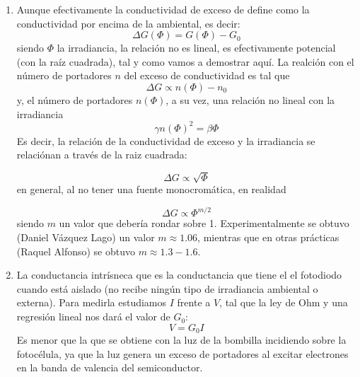 \begin{enumerate}[label=\alph*)]
	\item Aunque efectivamente la conductividad de exceso de define como la conductividad por encima de la ambiental, es decir:
	      \begin{equation*}
		      \Delta G (\Phi) = G(\Phi)  - G_0
	      \end{equation*}
	siendo $\Phi$ la irradiancia, la relación no es lineal, es efectivamente potencial (con la raíz cuadrada), tal y como vamos a demostrar aquí. La realción con el número de portadores $n$ del exceso de conductividad es tal que
	      \begin{equation*}
		      \Delta G \propto n(\Phi) - n_0
	      \end{equation*}
	y, el número de portadores $n(\Phi)$, a su vez, una relación no lineal con la irradiancia
	      \begin{equation*}
		      \gamma n(\Phi)^2 = \beta  \Phi
	      \end{equation*}
	Es decir, la relación de la conductividad de exceso y la irradiancia se relaciónan a través de la raiz cuadrada:

	      \begin{equation*}
		      \Delta G \propto \sqrt{\Phi}
	      \end{equation*}
	en general, al no tener una fuente monocromática, en realidad

	      \begin{equation*}
		      \Delta G \propto \Phi^{m/2}
	      \end{equation*}
	siendo $m$ un valor que debería rondar sobre 1. Experimentalmente se obtuvo (Daniel Vázquez Lago) un valor $m\approx 1.06$, mientras que en otras prácticas (Raquel Alfonso) se obtuvo $m\approx 1.3-1.6$.

	\item La conductancia intrísneca que es la conductancia que tiene el el fotodiodo cuando está aislado (no recibe ningún tipo de irradiancia ambiental o externa). Para medirla estudiamos $I$ frente a $V$, tal que la ley de Ohm y una regresión lineal nos dará el valor de $G_0$:
	      \begin{equation*}
		      V = G_0 I
	      \end{equation*}
	      Es menor que la que se obtiene con la luz de la bombilla incidiendo sobre la fotocélula, ya que la luz genera un exceso de portadores al excitar electrones en la banda de valencia del semiconductor.
\end{enumerate}

